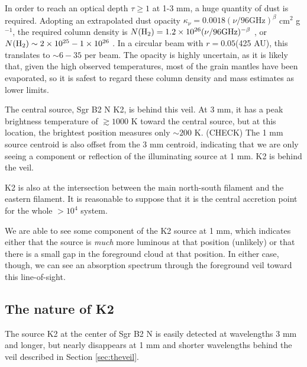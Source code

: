 \documentclass[twocolumn]{aastex61}
\begin{document}
In order to reach an optical depth $\tau\geq1$ at 1-3 mm, a huge quantity of
dust is required.  Adopting an extrapolated dust opacity $\kappa_\nu = 0.0018
(\nu/96 \mathrm{GHz})^{\beta}$ cm$^2$ g$^{-1}$, the required column density is
$N(\textrm{H}_{2}) = 1.2\times10^{26} (\nu/96 \mathrm{GHz})^{-\beta}$ \persc, or $N(\textrm{H}_{2}) \sim
2\times10^{25} - 1\times10^{26}$ \persc.  In a circular beam with $r=0.05$\arcsec (425 AU),
this translates to $\sim6-35$ \msun per beam.  The opacity is highly uncertain,
as it is likely that, given the high observed temperatures, most of the grain
mantles have been evaporated, so it is safest to regard these column density
and mass estimates as lower limits.

The central source, Sgr B2 N K2, is behind this veil.  At 3 mm, it has a peak
brightness temperature of $\gtrsim1000$ K toward the central source, but at this
location, the brightest position measures only $\sim200$ K.  (CHECK) The 1 mm 
source centroid is also offset from the 3 mm centroid, indicating that we are
only seeing a component or reflection of the illuminating source at 1 mm.
K2 is behind the veil.

K2 is also at the intersection between the main north-south filament and the
eastern filament.  It is reasonable to suppose that it is the central
accretion point for the whole $>10^4$ \msun system.

We are able to see some component of the K2 source at 1 mm, which indicates
either that the source is \emph{much} more luminous at that position (unlikely)
or that there is a small gap in the foreground cloud at that position.
In either case, though, we can see an absorption spectrum through the foreground
veil toward this line-of-sight.





\subsection{The nature of K2}
The source K2 at the center of Sgr B2 N is easily detected at wavelengths 3 mm
and longer, but nearly disappears at 1 mm and shorter wavelengths behind the
veil described in Section \ref{sec:theveil}.
\end{document}
